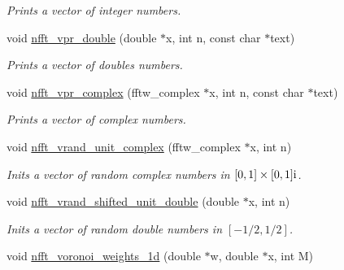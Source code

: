 \begin{CompactItemize}
\begin{CompactList}\small\item\em Prints a vector of integer numbers. \item\end{CompactList}\item 
\hypertarget{group__nfftutil_g5021b4c5ea2a24b0014786deb81cca91}{
void \hyperlink{group__nfftutil_g5021b4c5ea2a24b0014786deb81cca91}{nfft\_\-vpr\_\-double} (double $\ast$x, int n, const char $\ast$text)}
\label{group__nfftutil_g5021b4c5ea2a24b0014786deb81cca91}

\begin{CompactList}\small\item\em Prints a vector of doubles numbers. \item\end{CompactList}\item 
\hypertarget{group__nfftutil_g52ad07055e22b83a016bdbf43d3884d0}{
void \hyperlink{group__nfftutil_g52ad07055e22b83a016bdbf43d3884d0}{nfft\_\-vpr\_\-complex} (fftw\_\-complex $\ast$x, int n, const char $\ast$text)}
\label{group__nfftutil_g52ad07055e22b83a016bdbf43d3884d0}

\begin{CompactList}\small\item\em Prints a vector of complex numbers. \item\end{CompactList}\item 
\hypertarget{group__nfftutil_g5f53c8cd0b2f33200fce15ecf75a0685}{
void \hyperlink{group__nfftutil_g5f53c8cd0b2f33200fce15ecf75a0685}{nfft\_\-vrand\_\-unit\_\-complex} (fftw\_\-complex $\ast$x, int n)}
\label{group__nfftutil_g5f53c8cd0b2f33200fce15ecf75a0685}

\begin{CompactList}\small\item\em Inits a vector of random complex numbers in $[0,1]\times[0,1]{\rm i}$. \item\end{CompactList}\item 
\hypertarget{group__nfftutil_ga44184ac2c1452221508e7640f391c34}{
void \hyperlink{group__nfftutil_ga44184ac2c1452221508e7640f391c34}{nfft\_\-vrand\_\-shifted\_\-unit\_\-double} (double $\ast$x, int n)}
\label{group__nfftutil_ga44184ac2c1452221508e7640f391c34}

\begin{CompactList}\small\item\em Inits a vector of random double numbers in $[-1/2,1/2]$. \item\end{CompactList}\item 
\hypertarget{group__nfftutil_g797e81f55e6379efabf4d98522d1ee9d}{
void \hyperlink{group__nfftutil_g797e81f55e6379efabf4d98522d1ee9d}{nfft\_\-voronoi\_\-weights\_\-1d} (double $\ast$w, double $\ast$x, int M)}
\label{group__nfftutil_g797e81f55e6379efabf4d98522d1ee9d}


\end{CompactItemize}
